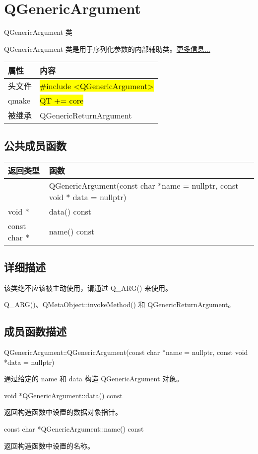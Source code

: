 \chapter{QGenericArgument }

QGenericArgument 类

QGenericArgument 类是用于序列化参数的内部辅助类。\href{https://github.com/JackLovel/QtDocumentCN/blob/master/Src/G/QGenericArgument/QGenericArgument.md#%E8%AF%A6%E7%BB%86%E6%8F%8F%E8%BF%B0}{更多信息...}

\begin{tabular}{|l|l|}
\hline
属性& 	内容\\
\hline
头文件& 	\hl{\#include <QGenericArgument>}\\
\hline
qmake& 	\hl{QT += core}\\
\hline
被继承& 	QGenericReturnArgument\\
\hline
\end{tabular}


\splitLine

\section{公共成员函数}


\begin{tabular}{|l|m{30em}|}
\hline
返回类型& 	函数\\
\hline
	&QGenericArgument(const char *name = nullptr, const void * data =
   nullptr)\\
\hline
void * 	&data() const\\
\hline
const char *& 	name() const\\
\hline
\end{tabular}

\splitLine

\section{详细描述}

该类绝不应该被主动使用，请通过 Q\_ARG() 来使用。



\begin{notice}[另请参阅]
Q\_ARG()、QMetaObject::invokeMethod() 和 QGenericReturnArgument。
\end{notice}

\splitLine

\section{成员函数描述}

QGenericArgument::QGenericArgument(const char *name = nullptr, const void *data = nullptr)

通过给定的 name 和 data 构造 QGenericArgument 对象。

void *QGenericArgument::data() const

返回构造函数中设置的数据对象指针。

const char *QGenericArgument::name() const

返回构造函数中设置的名称。

